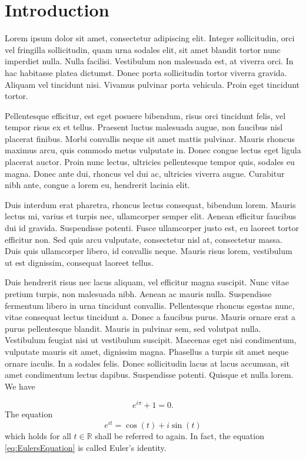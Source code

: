 \documentclass{article}
\begin{document}
\newpage
\tableofcontents
\newpage
{}
\section{Introduction}
\noindent Lorem ipsum dolor sit amet, consectetur adipiscing elit. Integer sollicitudin, orci vel fringilla sollicitudin, quam urna sodales elit, sit amet blandit tortor nunc imperdiet nulla. Nulla facilisi. Vestibulum non malesuada est, at viverra orci. In hac habitasse platea dictumst. Donec porta sollicitudin tortor viverra gravida. Aliquam vel tincidunt nisi. Vivamus pulvinar porta vehicula. Proin eget tincidunt tortor.

Pellentesque efficitur, est eget posuere bibendum, risus orci tincidunt felis, vel tempor risus ex et tellus. Praesent luctus malesuada augue, non faucibus nisl placerat finibus. Morbi convallis neque sit amet mattis pulvinar. Mauris rhoncus maximus arcu, quis commodo metus vulputate in. Donec congue lectus eget ligula placerat auctor. Proin nunc lectus, ultricies pellentesque tempor quis, sodales eu magna. Donec ante dui, rhoncus vel dui ac, ultricies viverra augue. Curabitur nibh ante, congue a lorem eu, hendrerit lacinia elit.

Duis interdum erat pharetra, rhoncus lectus consequat, bibendum lorem. Mauris lectus mi, varius et turpis nec, ullamcorper semper elit. Aenean efficitur faucibus dui id gravida. Suspendisse potenti. Fusce ullamcorper justo est, eu laoreet tortor efficitur non. Sed quis arcu vulputate, consectetur nisl at, consectetur massa. Duis quis ullamcorper libero, id convallis neque. Mauris risus lorem, vestibulum ut est dignissim, consequat laoreet tellus.

Duis hendrerit risus nec lacus aliquam, vel efficitur magna suscipit. Nunc vitae pretium turpis, non malesuada nibh. Aenean ac mauris nulla. Suspendisse fermentum libero in urna tincidunt convallis. Pellentesque rhoncus egestas nunc, vitae consequat lectus tincidunt a. Donec a faucibus purus. Mauris ornare erat a purus pellentesque blandit. Mauris in pulvinar sem, sed volutpat nulla. Vestibulum feugiat nisi ut vestibulum suscipit. Maecenas eget nisi condimentum, vulputate mauris sit amet, dignissim magna. Phasellus a turpis sit amet neque ornare iaculis. In a sodales felis. Donec sollicitudin lacus at lacus accumsan, sit amet condimentum lectus dapibus. Suspendisse potenti. Quisque et nulla lorem. We have

\begin{equation*}
e^{i\pi}+1=0.
\end{equation*}
The equation
\begin{equation}\label{eq:EulersEquation}
e^{it}=\cos(t)+i\sin(t)
\end{equation}
which holds for all $t\in\mathbb{R}$ shall be referred to again. In fact, the equation \eqref{eq:EulersEquation} is called Euler's identity.
\end{document}
